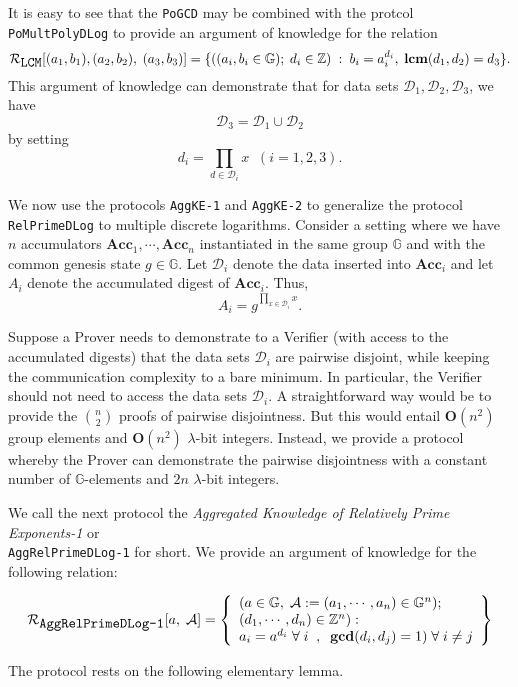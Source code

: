 \documentclass[11pt, lettersize, notitlepage, leqno, footskip=0.6cm]{article}
\newcommand{\bz}{\mathbb Z}
\newcommand{\pl}{\prod\limits}
\newcommand{\Acc}{\mbf{Acc}}
\newcommand{\mc}{\mathcal}
\newcommand{\mb}{\mathbb}
\newcommand{\mbf}{\mathbf}
\newcommand{\lam}{\lambda}
\newcommand{\vs}{\vspace{-0.15cm}}
\newcommand{\noin}{\noindent}
\newcommand{\LCM}{\mbf{lcm}}
\newcommand{\GCD}{\mbf{gcd}}
\numberwithin{equation}{section}
\begin{document}
It is easy to see that the \verb|PoGCD| may be combined with the protcol \verb|PoMultPolyDLog| to provide an argument of knowledge for the relation \vs $$\mc{R}_{{\protect\verb|LCM|}}[(a_1,b_1),(a_2,b_2), \; (a_3, b_3)] = \{((a_i, b_i\in\mb{G});\;d_i\in\bz)\;:\; b_i = a_i^{d_i},\;\LCM(d_1,d_2)=d_3 \} .$$ This argument of knowledge can demonstrate that for data sets $\mc{D}_1,\mc{D}_2, \mc{D}_3$, we have \vs $$\mc{D}_3 = \mc{D}_1\cup \mc{D}_2 $$ by setting \vs $$ d_i = \prod\limits_{d\in\mc{D}_i} x\;\;(i=1,2,3).$$

We now use the protocols \verb|AggKE-1| and \verb|AggKE-2| to generalize the protocol \verb|RelPrimeDLog| to multiple discrete logarithms. Consider a setting where we have $n$ accumulators $\Acc_1,\cdots,\Acc_n$ instantiated in the same group $\mb{G}$ and with the common genesis state $g\in\mb{G}$. Let $\mc{D}_i$ denote the data inserted into $\Acc_i$ and let $A_i$ denote the accumulated digest of $\Acc_i$. Thus, \vs $$A_i = g^{\pl_{x\in \mc{D}_i} x} .$$ 

Suppose a Prover needs to demonstrate to a Verifier (with access to the accumulated digests) that the data sets $\mc{D}_i$ are pairwise disjoint, while keeping the communication complexity to a bare minimum. In particular, the Verifier should not need to access the data sets $\mc{D}_i$. A straightforward way would be to provide the $n\choose 2$ proofs of pairwise disjointness. But this would entail $\mbf{O}(n^2)$ group elements and $\mbf{O}(n^2)$ $\lam$-bit integers. Instead, we provide a protocol whereby the Prover can demonstrate the pairwise disjointness with a constant number of $\mb{G}$-elements and $2n$ $\lam$-bit integers.

We call the next protocol the \textit{Aggregated Knowledge of Relatively Prime Exponents-1} or\\ \verb|AggRelPrimeDLog-1| for short. We provide an argument of knowledge for the following relation:

\[
  \mc{R}_{{\protect\verb|AggRelPrimeDLog-1|}}[a,\; \mc{A}] = \left\{\begin{array}{l}
    (a\in\mb{G},\;  \mc{A}:=(a_1,\cdots, a_n)\in\mb{G}^n);\\
    (d_1,\cdots,d_n)\in\bz^n): \\
    a_i = a^{d_i}\;\forall\;i\;\;,\;\; \GCD(d_i, d_j) = 1)\;\forall \;i\neq j   	
  \end{array}\right\}
\] 

\noin The protocol rests on the following elementary lemma.
\end{document}
